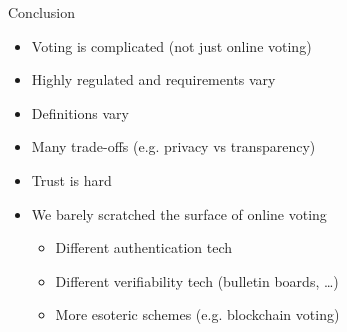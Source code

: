 \begin{frame}{Conclusion}
  \begin{itemize}[<+(1)->]
    \item Voting is complicated (not just online voting)
    \item Highly regulated and requirements vary
    \item Definitions vary
    \item Many trade-offs (e.g. privacy vs transparency)
    \item Trust is hard
    \item We barely scratched the surface of online voting
    \begin{itemize}
      \item Different authentication tech
      \item Different verifiability tech (bulletin boards, \dots)
      \item More esoteric schemes (e.g. blockchain voting)
    \end{itemize}
  \end{itemize}
\end{frame}



